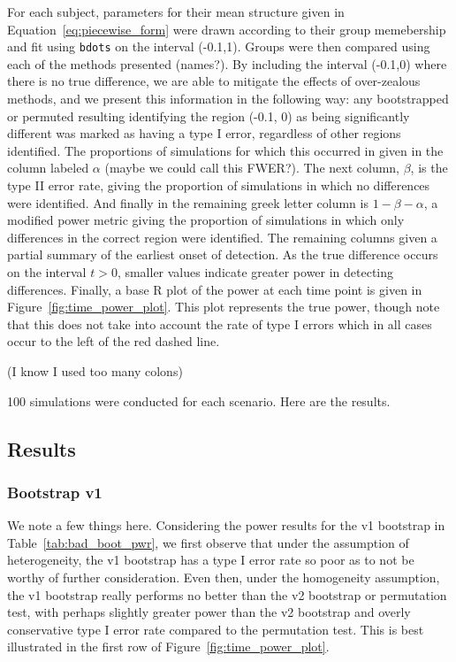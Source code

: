 \documentclass{article}
\newcommand{\xt}{\texttt}
\begin{document}
For each subject, parameters for their mean structure given in Equation~\ref{eq:piecewise_form} were drawn according to their group memebership and fit using \xt{bdots} on the interval (-0.1,1). Groups were then compared using each of the methods presented (names?). By including the interval (-0.1,0) where there is no true difference, we are able to mitigate the effects of over-zealous methods, and we present this information in the following way: any bootstrapped or permuted resulting identifying the region (-0.1, 0) as being significantly different was marked as having a type I error, regardless of other regions identified. The proportions of simulations for which this occurred in given in the column labeled $\alpha$ (maybe we could call this FWER?). The next column, $\beta$, is the type II error rate, giving the proportion of simulations in which no differences were identified. And finally in the remaining greek letter column is   $1-\beta-\alpha$, a modified power metric giving the proportion of simulations in which only differences in the correct region were identified. The remaining columns given a partial summary of the earliest onset of detection. As the true difference occurs on the interval $t > 0$, smaller values indicate greater power in detecting differences. Finally, a base R plot of the power at each time point is given in Figure~\ref{fig:time_power_plot}. This plot represents the true power, though note that this does not take into account the rate of type I errors which in all cases occur to the left of the red dashed line.

(I know I used too many colons)

100 simulations were conducted for each scenario. Here are the results.


\subsection{Results}

\subsubsection{Bootstrap v1}

We note a few things here. Considering the power results for the v1 bootstrap in Table~\ref{tab:bad_boot_pwr}, we first observe that under the assumption of heterogeneity, the v1 bootstrap has a type I error rate so poor as to not be worthy of further consideration. Even then, under the homogeneity assumption, the v1 bootstrap really performs no better than the v2 bootstrap or permutation test, with perhaps slightly greater power than the v2 bootstrap and overly conservative type I error rate compared to the permutation test. This is best illustrated in the first row of Figure~\ref{fig:time_power_plot}.
\end{document}
